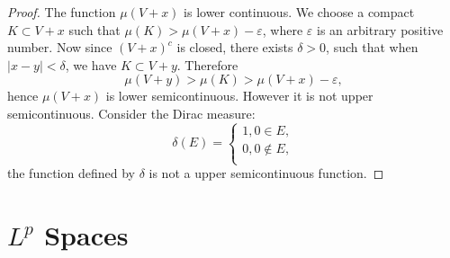 \begin{proof}
The function $\mu(V+x)$ is lower continuous. We choose a compact $K\subset V+x$ such that $\mu(K)>\mu(V+x)-\varepsilon$, where $\varepsilon$ is an arbitrary positive number. Now since $(V+x)^c$ is closed, there exists $\delta>0$, such that when $|x-y|<\delta$, we have $K\subset V+y$. Therefore 
$$\mu(V+y)>\mu(K)>\mu(V+x)-\varepsilon,$$
hence $\mu(V+x)$ is lower semicontinuous. However it is not upper semicontinuous. Consider the Dirac measure:
$$
\delta \left( E \right) =\begin{cases}
	1,0\in E,\\
	0,0\notin E,\\
\end{cases}
$$
the function defined by $\delta$ is not a upper semicontinuous function.
\end{proof}
\newpage
\section{$L^p$ Spaces}
